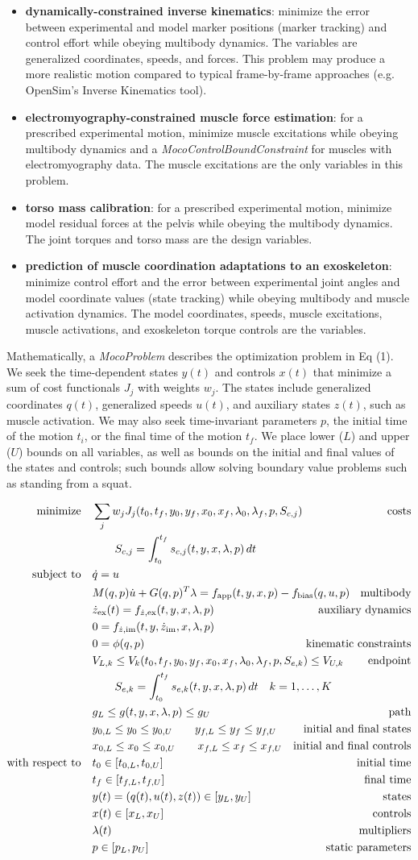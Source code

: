 \documentclass[10pt,letterpaper]{article}
\newcommand{\ocp}{
\begin{align}
    \begin{aligned}
        \mbox{minimize}
         \quad & \sum_j w_{j} J_{j}(t_0, t_f, y_0, y_f, x_{0}, \mathrlap{x_{f}, \lambda_0, \lambda_f, p, S_{c,j})} & \textrm{costs} \\
        & \quad\quad S_{c,j} = \int_{t_0}^{t_f} s_{c,j}(t, y, x, \lambda, p)\,dt  \\
        \mbox{subject to}
         \quad & \dot{q} = u \\
         & M(q, p)\dot{u} + G(q, p)^T \lambda = \mathrlap{f_{\mathrm{app}}(t, y, x, p) - f_{\mathrm{bias}}(q, u, p)}  & \textrm{multibody} \\
         & \dot{z}_\textrm{ex}(t) = f_{\dot{z},\textrm{ex}}(t, y, x, \lambda, p) & \textrm{auxiliary dynamics} \\
         & 0 = f_{\dot{z},\textrm{im}}(t, y, \dot{z}_{\textrm{im}}, x, \lambda, p) \\
         & 0 = \phi(q, p) & \textrm{kinematic constraints} \\
         & V_{L,k} \leq V_k(t_0, t_f, y_0, \mathrlap{y_f, x_{0}, x_{f}, \lambda_0, \lambda_f, p, S_{e,k}) \leq V_{U,k}} & \textrm{endpoint} \\
         & \quad\quad S_{e,k} = \mathrlap{\int_{t_0}^{t_f} s_{e,k}(t, y, x, \lambda, p)\,dt \quad k = 1, \ldots, K}\\
         & g_{L} \leq g(t, y, x, \lambda, p) \leq g_{U} & \textrm{path} \\
         & y_{0,L} \leq y_0 \leq y_{0,U} \quad\quad y_{f,L} \leq y_f \leq y_{f,U} & \textrm{initial and final states} \\
         & x_{0,L} \leq x_0 \leq x_{0,U} \quad\quad x_{f,L} \leq x_f \leq x_{f,U} & \textrm{initial and final controls} \\
         \mbox{with respect to} \quad
         & t_0 \in [t_{0,L}, t_{0,U}] & \textrm{initial time} \\
         & t_f \in [t_{f,L}, t_{f,U}] & \textrm{final time} \\
         & y(t) = (q(t), u(t), z(t)) \in [y_{L}, y_{U}] & \textrm{states} \\
         & x(t) \in [x_{L}, x_{U}] & \textrm{controls} \\
         & \lambda(t) & \textrm{multipliers} \\
         & p \in [p_{L}, p_{U}] & \textrm{static parameters}
    \end{aligned}
\end{align}
}
\begin{document}
\begin{itemize}
\item \textbf{dynamically-constrained inverse kinematics}: minimize the error between experimental and model marker positions (marker tracking) and control effort while obeying multibody dynamics. The variables are generalized coordinates, speeds, and forces. This problem may produce a more realistic motion compared to typical frame-by-frame approaches (e.g. OpenSim’s Inverse Kinematics tool).
\item \textbf{electromyography-constrained muscle force estimation}: for a prescribed experimental motion, minimize muscle excitations while obeying multibody dynamics and a \textit{MocoControlBoundConstraint} for muscles with electromyography data. The muscle excitations are the only variables in this problem.
\item \textbf{torso mass calibration}: for a prescribed experimental motion, minimize model residual forces at the pelvis while obeying the multibody dynamics. The joint torques and torso mass are the design variables.
\item \textbf{prediction of muscle coordination adaptations to an exoskeleton}: minimize control effort and the error between experimental joint angles and model coordinate values (state tracking) while obeying multibody and muscle activation dynamics. The model coordinates, speeds, muscle excitations, muscle activations, and exoskeleton torque controls are the variables.
\end{itemize}
Mathematically, a \textit{MocoProblem} describes the optimization problem in Eq (1). We seek the time-dependent states $y(t)$ and controls $x(t)$ that minimize a sum of cost functionals $J_j$ with weights $w_j$. The states include generalized coordinates $q(t)$, generalized speeds $u(t)$, and auxiliary states $z(t)$, such as muscle activation. We may also seek time-invariant parameters $p$, the initial time of the motion $t_i$, or the final time of the motion $t_f$. We place lower ($L$) and upper ($U$) bounds on all variables, as well as bounds on the initial and final values of the states and controls; such bounds allow solving boundary value problems such as standing from a squat.

\ocp
\end{document}

